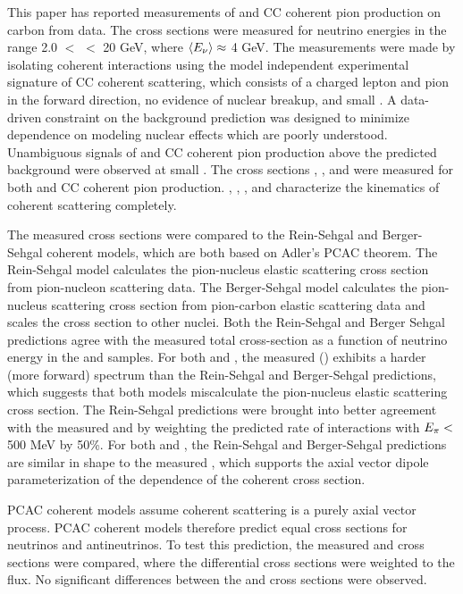 This paper has reported measurements of \numu and \numubar CC coherent pion production on carbon from \minerva data.
The cross sections were measured for neutrino energies in the range 2.0 $<$ \enu $<$ 20 GeV, where
$\langle E_{\nu}\rangle\approx$ 4 GeV.  The measurements were made by isolating coherent interactions using the model
independent experimental signature of CC coherent scattering, which consists of a charged lepton and pion in the
forward direction, no evidence of nuclear breakup, and small \tabs.
A data-driven constraint on the background prediction was designed to minimize dependence on modeling nuclear
effects which are poorly understood.  Unambiguous signals of \numu and \numubar CC coherent pion production above
the predicted background were observed at small \tabs.  The cross sections \sigenu, \dsigdqsq, \dsigdepi
and \dsigdthetapi were measured for both \numu and \numubar CC coherent pion production.  \enu, \qsq, \epi, \thetapi
and \tabs characterize the kinematics of coherent scattering completely.

The measured cross sections were compared to the Rein-Sehgal and Berger-Sehgal coherent models, which are both
based on Adler's PCAC theorem.  The Rein-Sehgal model calculates the pion-nucleus elastic scattering cross section
from pion-nucleon scattering data.  The Berger-Sehgal model calculates the pion-nucleus scattering cross section
from pion-carbon elastic scattering data and scales the cross section to other nuclei.  Both the Rein-Sehgal and
Berger Sehgal predictions agree with the measured total cross-section as a function of neutrino energy in the \numu and \numubar samples.  For both
\numu and \numubar, the measured \dsigdepi (\dsigdthetapi) exhibits a harder (more forward) spectrum than the
Rein-Sehgal and Berger-Sehgal predictions, which suggests that both models miscalculate the pion-nucleus elastic
scattering cross section.  The Rein-Sehgal predictions were brought into better agreement with the measured
\dsigdepi and \dsigdthetapi by weighting the predicted rate of interactions with $E_{\pi}<$ 500 MeV by 50\%.  For
both \numu and \numubar, the Rein-Sehgal and Berger-Sehgal predictions are similar in shape to the measured \dsigdqsq,
which supports the axial vector dipole parameterization of the \qsq dependence of the coherent cross section.

PCAC coherent models assume coherent scattering is a purely axial vector process.  PCAC coherent models therefore
predict equal cross sections for neutrinos and antineutrinos.  To test this prediction, the measured \numu and
\numubar cross sections were compared, where the \numu differential cross sections were weighted to the \numubar flux.
No significant differences between the \numu and \numubar cross sections were observed.

